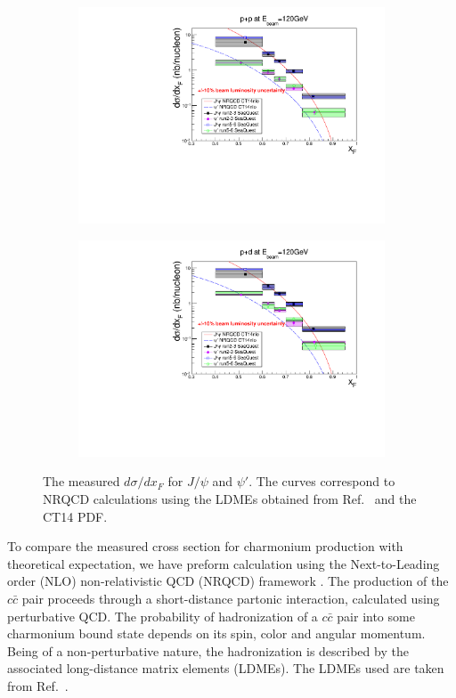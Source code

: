 \documentclass[reprint,aps,unsortedaddress,superscriptaddress,prd,floatfix,showpacs,linenumbers]{revtex4-2}
\begin{document}
\begin{figure}[h]
	\begin{subfigure}{0.45\linewidth}
		\includegraphics[width=\linewidth]{figures/crossSections/xF/combine_xF_LH2_5-6_5770_psip}
	\end{subfigure}
	\begin{subfigure}{0.45\linewidth}
		\includegraphics[width=\linewidth]{figures/crossSections/xF/combine_xF_LD2_5-6_5770_psip}
	\end{subfigure}
	\caption{The measured $d\sigma /d x_F$ for $J/\psi$ and $\psi'$. The curves correspond to NRQCD
		calculations using the LDMEs obtained from Ref.~\cite{hsieh2021} and the CT14 PDF.}
	\label{fig:xF_cross_sections}
\end{figure}

To compare the measured cross section for charmonium 
production with theoretical expectation, we have preform calculation
using the Next-to-Leading order (NLO) non-relativistic QCD (NRQCD)
framework \cite{bodwin1995}. The production of the $c\bar{c}$ pair proceeds
through a short-distance partonic interaction, calculated using perturbative QCD.
The probability of hadronization of a $c\bar{c}$ pair into some charmonium bound
state depends on its spin, color and angular momentum.
Being of a non-perturbative nature, the hadronization is described by the associated
long-distance matrix elements (LDMEs). The LDMEs used are taken from Ref.~\cite{hsieh2021}.
\end{document}
